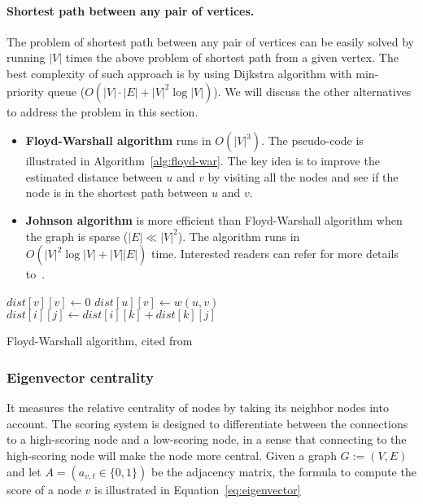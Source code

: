 \paragraph{Shortest path between any pair of vertices.}
The problem of shortest path between any pair of vertices can be easily solved
by running $|V|$ times the above problem of shortest path from a given vertex.
The best complexity of such approach is by using Dijkstra algorithm with min-
priority queue ($O(|V|\cdot|E|+|V|^2\log|V|)$). We will discuss the other
alternatives to address the problem in this section.
	\begin{itemize}	
	\squish
		\item {\bf Floyd-Warshall algorithm} runs in $O(|V|^3)$. The pseudo-code 
		is illustrated in Algorithm~\ref{alg:floyd-war}. The key idea is
		to improve the estimated distance between $u$ and $v$ by visiting all
		the nodes and see if the node is in the shortest path between $u$ and
		$v$.

	 	\item {\bf Johnson algorithm} is more efficient than Floyd-Warshall
	 	algorithm when the graph is sparse ($|E| \ll |V|^2$). The algorithm
	 	runs in $O(|V|^2\log|V| + |V||E|)$ time. Interested readers can refer for
	 	more details to~\cite{johnson-alg}.
	\end{itemize}

\begin{algorithm}
	\begin{algorithmic}[1]		
		   \State $dist[v][v] \gets 0$	
		\EndFor
		   \State $dist[u][v] \gets w(u,v)$  
		\EndFor
		            \State $dist[i][j]\gets  dist[i][k] + dist[k][j]$
		        \EndIf
		      \EndFor
		    \EndFor
		\EndFor
	\end{algorithmic}
\caption{Floyd-Warshall algorithm, cited from~\cite{floyd-war-wiki}}
\label{alg:floyd-war}
\end{algorithm}

\subsubsection{Eigenvector centrality}
%
It measures the relative centrality of nodes by taking its neighbor nodes into
account. The scoring system is designed to differentiate between the
connections to a high-scoring node and a low-scoring node, in a sense that
connecting to the high-scoring node will make the node more central. Given a
graph $G:=(V,E)$ and let $A = (a_{v,t}\in\{0, 1\})$ be the adjacency matrix,
the formula to compute the score of a node $v$ is illustrated in
Equation~\eqref{eq:eigenvector}

